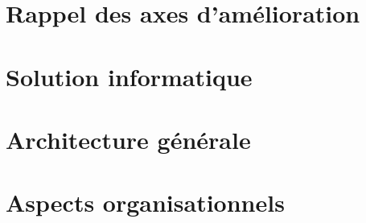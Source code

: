 

\newcommand{\mainTitle}{\'Etude préalable - SPIE}
\newcommand{\secondTitle}{Spécification solution spécifique}
\newcommand{\documentRef}{DS-SSP/4401/1}
\newcommand{\auteurs}{
Lisa \textsc{Courant} \\
Estelle \textsc{Lepeigneux} \\
Pierre \textsc{Jarsaillon} \\
Hugues \textsc{Verlin} \\
}
\newcommand{\chefDeProjet}{Paul \textsc{Dautry}}
\newcommand{\responsableQualite}{Antoine \textsc{Chabert}}





\tableofcontents
\listoffigures
\listoftables
\newpage

\part{Rappel des axes d'amélioration}
\setcounter{section}{0}


\part{Solution informatique}
\setcounter{section}{0}


\part{Architecture générale}
\setcounter{section}{0}


\part{Aspects organisationnels}
\setcounter{section}{0}




